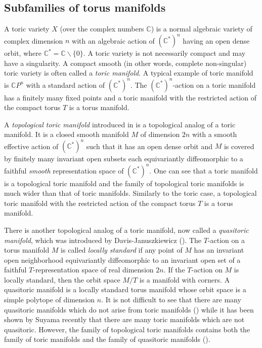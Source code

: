 \documentclass[12pt]{amsart}
\theoremstyle{plain} \numberwithin{equation}{section}
\theoremstyle{definition}
\def\C{\mathbb C}
\begin{document}
\subsection{Subfamilies of torus manifolds}

A toric variety $X$ (over the complex numbers $\C$) is a normal algebraic variety of complex dimension $n$ with an algebraic action of $(\C^*)^n$ having an open dense orbit, where $\C^*=\C\backslash \{0\}$. A toric variety is not necessarily compact and may have a singularity.  A compact smooth (in other words, complete non-singular) toric variety is often called a \emph{toric manifold}. A typical example of toric manifold is $\C P^n$ with a standard action of $(\C^*)^n$.  The $(\C^*)^n$-action on a toric manifold has a finitely many fixed points and a toric manifold with the restricted action of the compact torus $T$ is a torus manifold. 

A \emph{topological toric manifold} introduced in \cite{is-fu-ma13} is a topological analog of a toric manifold. It is a closed smooth manifold $M$ of dimension $2n$ with a smooth effective action of $(\C^*)^n$ such that it has an open dense orbit and $M$ is covered by finitely many invariant open subsets each equivariantly diffeomorphic to a faithful \emph{smooth} representation space of $(\C^*)^n$.  One can see that a toric manifold is a topological toric manifold and the family of topological toric manifolds is much wider than that of toric manifolds.  Similarly to the toric case, a topological toric manifold with the restricted action of the compact torus $T$ is a torus manifold. 

There is another topological analog of a toric manifold, now called a \emph{quasitoric manifold}, which was introduced by Davis-Januszkiewicz (\cite{da-ja91}).  The $T$-action on a torus manifold $M$ is called \emph{locally standard} if any point of $M$ has an invariant open neighborhood equivariantly diffeomorphic to an invariant open set of a faithful $T$-representation space of real dimension $2n$.  If the $T$-action on $M$ is locally standard, then the orbit space $M/T$ is a manifold with corners.  A quasitoric manifold is a locally standard torus manifold whose orbit space is a simple polytope of dimension $n$. 
It is not difficult to see that there are many quasitoric manifolds which do not arise from toric manifolds (\cite{da-ja91}) while it has been shown by Suyama \cite{suya14} recently that there are many toric manifolds which are not quasitoric.  
However, the family of topological toric manifolds contains both the family of toric manifolds and the family of quasitoric manifolds (\cite{is-fu-ma13}).  
\end{document}
